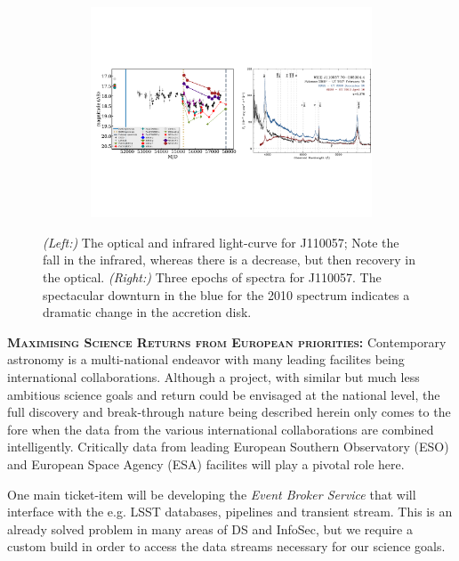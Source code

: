 \begin{figure}[h]
  \begin{center}
    \hspace{-0.5cm}
    \includegraphics[height=6.25cm,width=17.2cm]
    {figures/J110057_LC_Spectra_20171024.pdf}
    \vspace{-10pt}
    \caption{%
      \footnotesize 
      {\it (Left:)} The optical and infrared light-curve for J110057; 
      Note the fall in the infrared, whereas there is a decrease, but 
      then recovery in the optical. 
      {\it (Right:)} 
      Three epochs of spectra for J110057. 
      The spectacular downturn in the blue for the 2010 spectrum 
      indicates a dramatic change in the accretion disk.
    }
  \vspace{-16pt}
 \label{fig:J110057}
\end{center}
\end{figure}


\smallskip
\smallskip
\noindent
\textbf{\textsc{Maximising Science Returns from European priorities:}}
Contemporary astronomy is a multi-national endeavor with many leading
facilites being international collaborations. Although a project, with
similar but much less ambitious science goals and return could be
envisaged at the national level, the full discovery and break-through
nature being described herein only comes to the fore when the data
from the various international collaborations are combined
intelligently.  Critically data from leading European Southern
Observatory (ESO) and European Space Agency (ESA) facilites will play
a pivotal role here.

\smallskip
\smallskip
\noindent
One main ticket-item will be developing the {\it Event Broker Service}
that will interface with the e.g. LSST databases, pipelines and
transient stream. This is an already solved problem in many areas 
of DS and InfoSec, but we require a custom build in order to access 
the data streams necessary for our science goals. 


